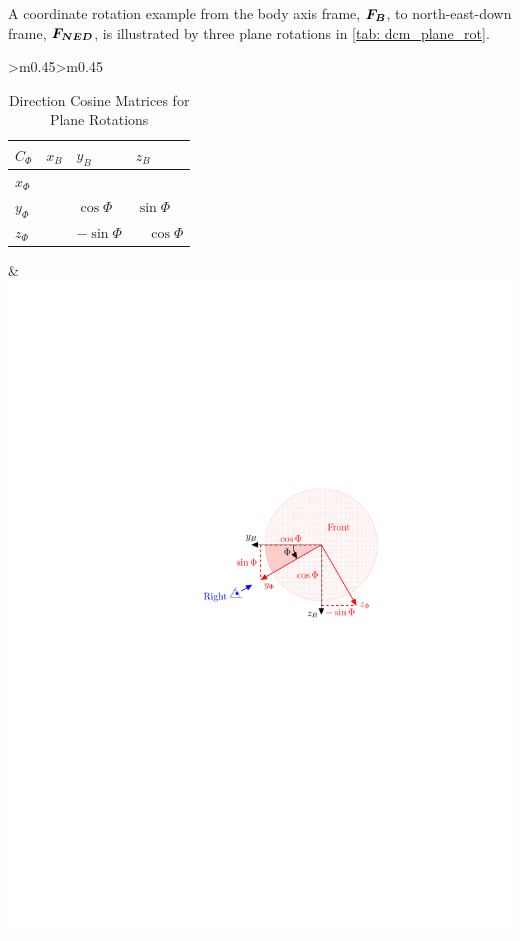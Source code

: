\documentclass[12pt]{ucthesis}
\begin{document}
A coordinate rotation example from the body axis frame, $\boldsymbol{F_B}$, to north-east-down frame, $\boldsymbol{F_{NED}}$, is illustrated by three plane rotations in \autoref{tab: dcm_plane_rot}.
%
\begin{table}[!ht]
  	\centering
  	\caption{Direction Cosine Matrices for Plane Rotations}
    \begin{tabular}{>{\centering\arraybackslash}m{}>{\centering\arraybackslash}m{}}
	\toprule
		\begin{tabular}{>{\centering\arraybackslash}m{.25in}|>{\centering\arraybackslash}m{.5in}>{\centering\arraybackslash}m{.5in}>{\centering\arraybackslash}m{.5in}}
		$C_{\Phi}$ & $x_B$ & $y_B$ & $z_B$\\ 
		\hline
		$x_{\Phi}$ & 1 & 0 & 0 \\
		$y_{\Phi}$ & 0 & $\cos\Phi$ & $\sin\Phi$ \\
		$z_{\Phi}$ & 0 & $-\sin\Phi$ & $\;\;\;\cos\Phi$ \\
		\end{tabular}
	&
		\includegraphics[clip=true, viewport=3.25in 5.25in 6.75in 7.5in, scale=.75]{figs/fig_dcm_2D_1.pdf}

\end{tabular}
\end{table}
\end{document}
